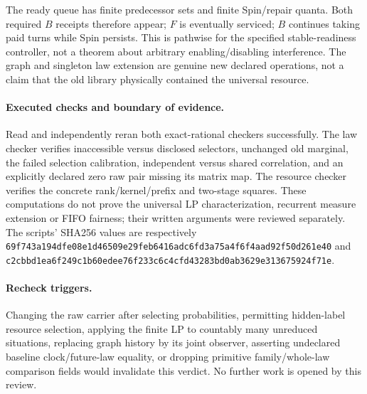 \documentclass{article}
\begin{document}
The ready queue has finite predecessor sets and finite Spin/repair quanta. Both required $B$ receipts therefore appear; $F$ is eventually serviced; $B$ continues taking paid turns while Spin persists. This is pathwise for the specified stable-readiness controller, not a theorem about arbitrary enabling/disabling interference. The graph and singleton law extension are genuine new declared operations, not a claim that the old library physically contained the universal resource.

\paragraph{Executed checks and boundary of evidence.}
Read and independently reran both exact-rational checkers successfully. The law checker verifies inaccessible versus disclosed selectors, unchanged old marginal, the failed selection calibration, independent versus shared correlation, and an explicitly declared zero raw pair missing its matrix map. The resource checker verifies the concrete rank/kernel/prefix and two-stage squares. These computations do not prove the universal LP characterization, recurrent measure extension or FIFO fairness; their written arguments were reviewed separately. The scripts' SHA256 values are respectively
\texttt{69f743a194dfe08e1d46509e29feb6416adc6fd3a75a4f6f4aad92f50d261e40}
and
\texttt{c2cbbd1ea6f249c1b60edee76f233c6c4cfd43283bd0ab3629e313675924f71e}.

\paragraph{Recheck triggers.}
Changing the raw carrier after selecting probabilities, permitting hidden-label resource selection, applying the finite LP to countably many unreduced situations, replacing graph history by its joint observer, asserting undeclared baseline clock/future-law equality, or dropping primitive family/whole-law comparison fields would invalidate this verdict. No further work is opened by this review.
\end{document}
